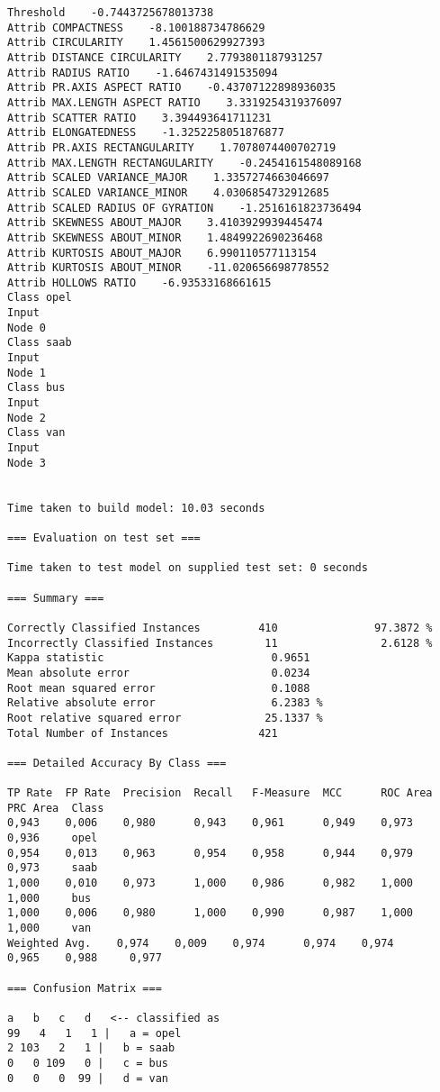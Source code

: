\documentclass[
	article,			%
	11pt,				%
	oneside,			%
	a4paper,			%
	english,			%
	brazil,				%
	sumario=tradicional
	]{abntex2}
\begin{document}
\begin{lstlisting}
Threshold    -0.7443725678013738
Attrib COMPACTNESS    -8.100188734786629
Attrib CIRCULARITY    1.4561500629927393
Attrib DISTANCE CIRCULARITY    2.7793801187931257
Attrib RADIUS RATIO    -1.6467431491535094
Attrib PR.AXIS ASPECT RATIO    -0.43707122898936035
Attrib MAX.LENGTH ASPECT RATIO    3.3319254319376097
Attrib SCATTER RATIO    3.394493641711231
Attrib ELONGATEDNESS    -1.3252258051876877
Attrib PR.AXIS RECTANGULARITY    1.7078074400702719
Attrib MAX.LENGTH RECTANGULARITY    -0.2454161548089168
Attrib SCALED VARIANCE_MAJOR    1.3357274663046697
Attrib SCALED VARIANCE_MINOR    4.0306854732912685
Attrib SCALED RADIUS OF GYRATION    -1.2516161823736494
Attrib SKEWNESS ABOUT_MAJOR    3.4103929939445474
Attrib SKEWNESS ABOUT_MINOR    1.4849922690236468
Attrib KURTOSIS ABOUT_MAJOR    6.990110577113154
Attrib KURTOSIS ABOUT_MINOR    -11.020656698778552
Attrib HOLLOWS RATIO    -6.93533168661615
Class opel
Input
Node 0
Class saab
Input
Node 1
Class bus
Input
Node 2
Class van
Input
Node 3


Time taken to build model: 10.03 seconds

=== Evaluation on test set ===

Time taken to test model on supplied test set: 0 seconds

=== Summary ===

Correctly Classified Instances         410               97.3872 %
Incorrectly Classified Instances        11                2.6128 %
Kappa statistic                          0.9651
Mean absolute error                      0.0234
Root mean squared error                  0.1088
Relative absolute error                  6.2383 %
Root relative squared error             25.1337 %
Total Number of Instances              421     

=== Detailed Accuracy By Class ===

TP Rate  FP Rate  Precision  Recall   F-Measure  MCC      ROC Area  PRC Area  Class
0,943    0,006    0,980      0,943    0,961      0,949    0,973     0,936     opel
0,954    0,013    0,963      0,954    0,958      0,944    0,979     0,973     saab
1,000    0,010    0,973      1,000    0,986      0,982    1,000     1,000     bus
1,000    0,006    0,980      1,000    0,990      0,987    1,000     1,000     van
Weighted Avg.    0,974    0,009    0,974      0,974    0,974      0,965    0,988     0,977     

=== Confusion Matrix ===

a   b   c   d   <-- classified as
99   4   1   1 |   a = opel
2 103   2   1 |   b = saab
0   0 109   0 |   c = bus
0   0   0  99 |   d = van


\end{lstlisting}
\end{document}
